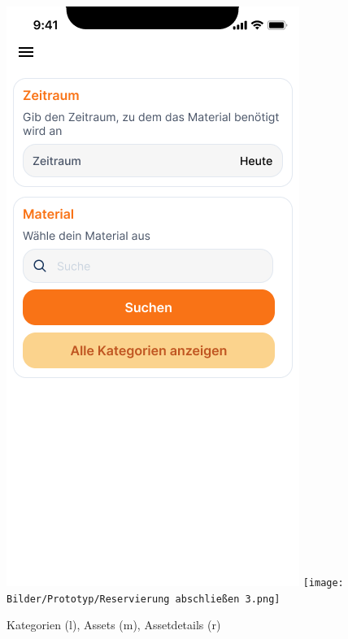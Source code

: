 \begin{figure}[h]
    \includegraphics[scale=0.3]{Bilder/Prototyp/Neu/Suche.png}
    \texttt{[image: Bilder/Prototyp/Reservierung abschließen 3.png]}
    \label{fig:p3}
    \caption[Mockup: Kategorien, Assets, Assetdetails]{Kategorien (l), Assets (m), Assetdetails (r)}
\end{figure}




